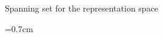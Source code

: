 \documentclass[final,t, mathserif]{beamer}
\newcommand{\ph}{\varphi}
\theoremstyle{plain}
\theoremstyle{definition}
\newcommand{\R}{\mathbb{R}}
\begin{document}
\begin{frame}{}
\begin{columns}[t]
\begin{column}{.3\linewidth}





\end{column}
\begin{column}{.3\linewidth}

\begin{block}{Spanning set for the representation space}

\newdimen\R
\R=0.7cm
  
\begin{figure}
   \centering
\end{figure}
\end{block}
\end{column}
\end{columns}
\end{frame}
\end{document}
